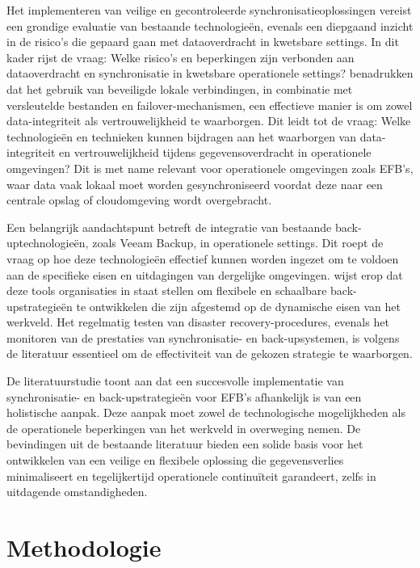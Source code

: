 Het implementeren van veilige en gecontroleerde synchronisatieoplossingen vereist een grondige evaluatie van bestaande technologieën, evenals een diepgaand inzicht in de risico’s die gepaard gaan met dataoverdracht in kwetsbare settings. In dit kader rijst de vraag: Welke risico’s en beperkingen zijn verbonden aan dataoverdracht en synchronisatie in kwetsbare operationele settings?
\textcite{VinayakBhuvi} benadrukken dat het gebruik van beveiligde lokale verbindingen, in combinatie met versleutelde bestanden en failover-mechanismen, een effectieve manier is om zowel data-integriteit als vertrouwelijkheid te waarborgen. Dit leidt tot de vraag: Welke technologieën en technieken kunnen bijdragen aan het waarborgen van data-integriteit en vertrouwelijkheid tijdens gegevensoverdracht in operationele omgevingen? Dit is met name relevant voor operationele omgevingen zoals EFB’s, waar data vaak lokaal moet worden gesynchroniseerd voordat deze naar een centrale opslag of cloudomgeving wordt overgebracht.

Een belangrijk aandachtspunt betreft de integratie van bestaande back-uptechnologieën, zoals Veeam Backup, in operationele settings. Dit roept de vraag op hoe deze technologieën effectief kunnen worden ingezet om te voldoen aan de specifieke eisen en uitdagingen van dergelijke omgevingen. \textcite{Yanamala2024} wijst erop dat deze tools organisaties in staat stellen om flexibele en schaalbare back-upstrategieën te ontwikkelen die zijn afgestemd op de dynamische eisen van het werkveld. Het regelmatig testen van disaster recovery-procedures, evenals het monitoren van de prestaties van synchronisatie- en back-upsystemen, is volgens de literatuur essentieel om de effectiviteit van de gekozen strategie te waarborgen.

De literatuurstudie toont aan dat een succesvolle implementatie van synchronisatie- en back-upstrategieën voor EFB's afhankelijk is van een holistische aanpak. Deze aanpak moet zowel de technologische mogelijkheden als de operationele beperkingen van het werkveld in overweging nemen. De bevindingen uit de bestaande literatuur bieden een solide basis voor het ontwikkelen van een veilige en flexibele oplossing die gegevensverlies minimaliseert en tegelijkertijd operationele continuïteit garandeert, zelfs in uitdagende omstandigheden.


\section{Methodologie}%
\label{sec:methodologie}

